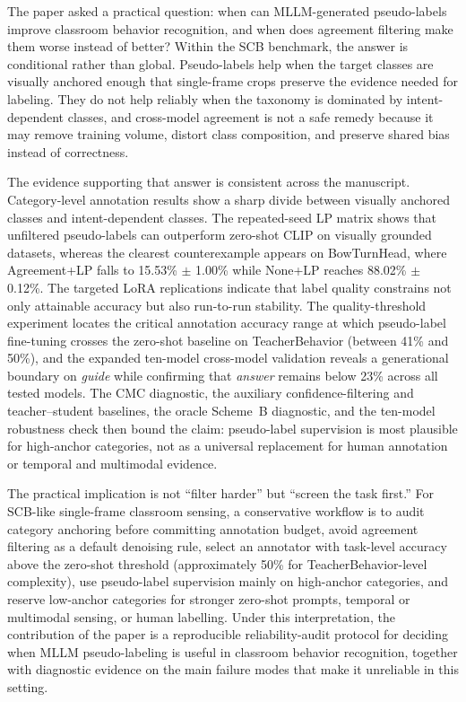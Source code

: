 \documentclass{ieeeaccess}
\begin{document}
The paper asked a practical question: when can MLLM-generated
pseudo-labels improve classroom behavior recognition, and when does
agreement filtering make them worse instead of better?
Within the SCB benchmark, the answer is conditional rather
than global.
Pseudo-labels help when the target classes are visually anchored
enough that single-frame crops preserve the evidence needed for
labeling.
They do not help reliably when the taxonomy is dominated by
intent-dependent classes, and cross-model agreement is not a safe
remedy because it may remove training volume, distort class
composition, and preserve shared bias instead of correctness.

The evidence supporting that answer is consistent across the
manuscript.
Category-level annotation results show a sharp divide between visually
anchored classes and intent-dependent classes.
The repeated-seed LP matrix shows that unfiltered pseudo-labels can
outperform zero-shot CLIP on visually grounded datasets, whereas the
clearest counterexample appears on BowTurnHead, where Agreement+LP
falls to 15.53\% $\pm$ 1.00\% while None+LP reaches 88.02\%
$\pm$ 0.12\%.
The targeted LoRA replications indicate that label quality constrains
not only attainable accuracy but also run-to-run stability.
The quality-threshold experiment locates the critical annotation accuracy
range at which pseudo-label fine-tuning crosses the zero-shot baseline on
TeacherBehavior (between 41\% and 50\%), and the expanded ten-model
cross-model validation reveals a generational boundary on
\textit{guide} while confirming that \textit{answer} remains below 23\%
across all tested models.
The CMC diagnostic, the auxiliary confidence-filtering and
teacher--student baselines, the oracle Scheme~B diagnostic, and the
ten-model robustness check then bound the claim: pseudo-label
supervision is most plausible for high-anchor categories, not as a
universal replacement for human annotation or temporal and multimodal
evidence.

The practical implication is not ``filter harder'' but
``screen the task first.''
For SCB-like single-frame classroom sensing, a conservative workflow is
to audit category anchoring before committing annotation budget,
avoid agreement filtering as a default denoising rule,
select an annotator with task-level accuracy above the zero-shot
threshold (approximately 50\% for TeacherBehavior-level complexity),
use pseudo-label supervision mainly on high-anchor categories,
and reserve low-anchor categories for stronger zero-shot prompts,
temporal or multimodal sensing, or human labelling.
Under this interpretation, the contribution of the paper is a
reproducible reliability-audit protocol for deciding when MLLM
pseudo-labeling is useful in classroom behavior recognition, together
with diagnostic evidence on the main failure modes that make it
unreliable in this setting.
\end{document}
